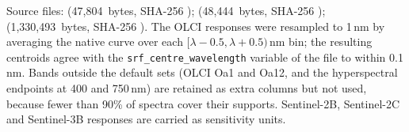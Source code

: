\begin{table}[!htbp]
\par\smallskip\raggedright\footnotesize Source files: \texttt{} (47,804~bytes, SHA-256 \texttt{}); \texttt{} (48,444~bytes, SHA-256 \texttt{}); \texttt{} (1,330,493~bytes, SHA-256 \texttt{}). The OLCI responses were resampled to 1\,nm by averaging the native curve over each $[\lambda - 0.5, \lambda + 0.5)$\,nm bin; the resulting centroids agree with the \texttt{srf\_centre\_wavelength} variable of the file to within 0.1\,nm. Bands outside the default sets (OLCI Oa1 and Oa12, and the hyperspectral endpoints at 400 and 750\,nm) are retained as extra columns but not used, because fewer than 90\% of spectra cover their supports. Sentinel-2B, Sentinel-2C and Sentinel-3B responses are carried as sensitivity units.
\end{table}
